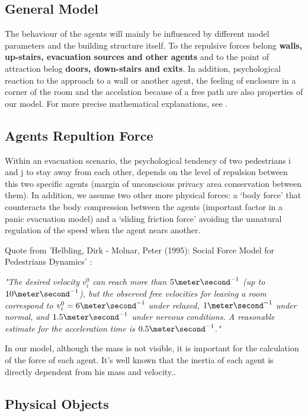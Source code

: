 \documentclass[11pt]{article}
\begin{document}


\subsection{General Model}

The behaviour of the agents will mainly be influenced by different model
parameters and the building structure itself. To the repulsive forces belong
\textbf{walls, up-stairs, evacuation sources and other agents} and to the point
of attraction belog \textbf{doors, down-stairs and exits}. In
addition, psychological reaction to the approach to a wall or another agent, the
feeling of enclosure in a corner of the room and the accelation because of a
free path are also properties of our model. For more precise mathematical
explanations, see \cite{SFMPD}.

\subsection*{Agents Repultion Force}

Within an evacuation scenario, the psychological tendency of two pedestrians i
and j to stay away from each other, depends on the level of repulsion between
this two specific agents (margin of unconscious privacy area conservation
between them). In addition, we assume two other more physical forces: a `body
force' that counteracts the body compression between the agents (important
factor in a panic evacuation model) and a `sliding friction force' avoiding the
unnatural regulation of the speed when the agent nears another. \cite{SFMPD} 

Quote from 'Helbling, Dirk - Molnar, Peter (1995): Social Force Model for Pedestrians Dynamics' \cite{SFMPD} :
\begin{center}
\textit{"The desired velocity $v^0_i$ can reach more than $5 \meter\second^{-1}$
(up to $10 \meter\second^{-1}$), but the observed free velocities for leaving a 
room correspond to $v^0_i=6 \meter\second^{-1}$ under relaxed, $1\meter\second^{-1}$
under normal, and $1.5\meter\second^{-1}$ under nervous conditions. A reasonable
estimate for the acceleration time is $0.5\meter\second^{-1}$."}
\end{center}
In our model, although the mass is not visible, it is important for
the calculation of the force of each agent. It's well known that the inertia of
each agent is directly dependent from his mass and velocity..


\subsection*{Physical Objects}
\end{document}
